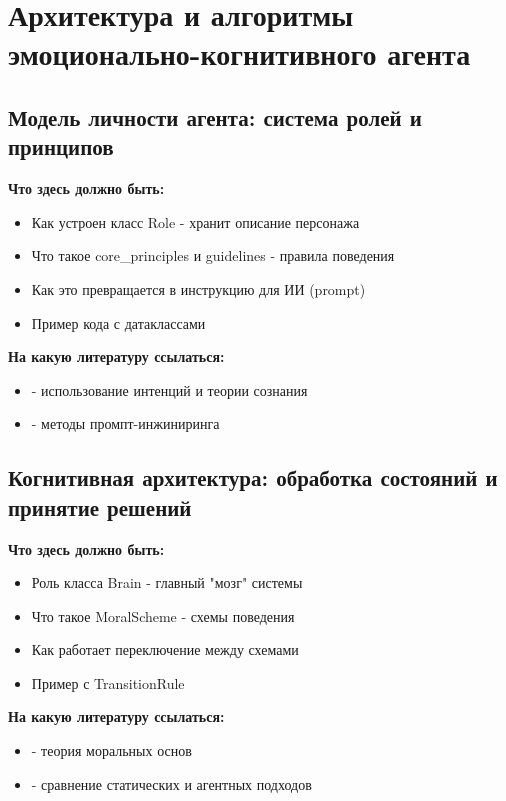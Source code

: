 \documentclass[a4paper,14pt]{extarticle}
\begin{document}
\section{Архитектура и алгоритмы эмоционально-когнитивного агента}

\subsection{Модель личности агента: система ролей и принципов}

\textbf{Что здесь должно быть:}
\begin{itemize}
\item Как устроен класс Role - хранит описание персонажа
\item Что такое core\_principles и guidelines - правила поведения
\item Как это превращается в инструкцию для ИИ (prompt)
\item Пример кода с датаклассами
\end{itemize}

\textbf{На какую литературу ссылаться:}
\begin{itemize}
\item \cite{6} - использование интенций и теории сознания
\item \cite{12} - методы промпт-инжиниринга
\end{itemize}

\subsection{Когнитивная архитектура: обработка состояний и принятие решений}

\textbf{Что здесь должно быть:}
\begin{itemize}
\item Роль класса Brain - главный "мозг" системы
\item Что такое MoralScheme - схемы поведения
\item Как работает переключение между схемами
\item Пример с TransitionRule
\end{itemize}

\textbf{На какую литературу ссылаться:}
\begin{itemize}
\item \cite{10} - теория моральных основ
\item \cite{7} - сравнение статических и агентных подходов
\end{itemize}
\end{document}
